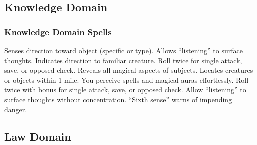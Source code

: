 \subsection{Knowledge Domain}
\subsubsection{Knowledge Domain Spells}
\begin{spelllist}
  \spellhead[1]{}
  \spellhead[1]{}
   Senses direction toward object (specific or type).
  \spellhead[2]{}
   Allows ``listening'' to surface thoughts.
   Indicates direction to familiar creature.
   Roll twice for single attack, save, or opposed check.
    Reveals all magical aspects of subjects.
   Locates creatures or objects within 1 mile.
  You perceive spells and magical auras effortlessly.
   Roll twice with bonus for single attack, save, or opposed check.
   Allow ``listening'' to surface thoughts without concentration.
  \spellhead[8]{}
   ``Sixth sense'' warns of impending danger.
\end{spelllist}

\subsection{Law Domain}

